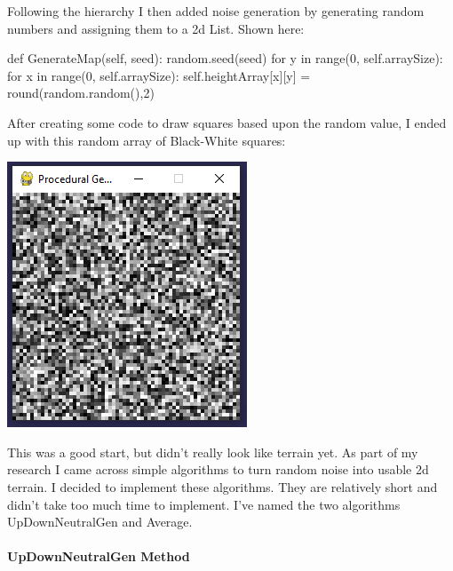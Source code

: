 \begin{flushleft}
            \vspace{0.5cm}

            Following the hierarchy I then added noise generation by generating random numbers and 
            assigning them to a 2d List. Shown here: 
            
            \begin{pythoncode}
def GenerateMap(self, seed):
    random.seed(seed)
    for y in range(0, self.arraySize):
        for x in range(0, self.arraySize):
            self.heightArray[x][y] = round(random.random(),2)
        \end{pythoncode}

            \vspace{0.5cm}

            \large
            After creating some code to draw squares based upon the random value, I ended up with this 
            random array of Black-White squares:\\
            \vspace{0.5cm}
            \centerline{\includegraphics{Images/Prototype/RandomNoiseExample.PNG}}

            \vspace{0.5cm}

            This was a good start, but didn't really look like terrain yet. As part of my research I came 
            across simple algorithms to turn random noise into usable 2d terrain. I decided to implement
            these algorithms. They are relatively short and didn't take too much time to implement. I've
            named the two algorithms UpDownNeutralGen and Average.

            \vspace{1cm}

            \paragraph{UpDownNeutralGen Method} \mbox{} \\
            \vspace{0.25cm}


\end{flushleft}
